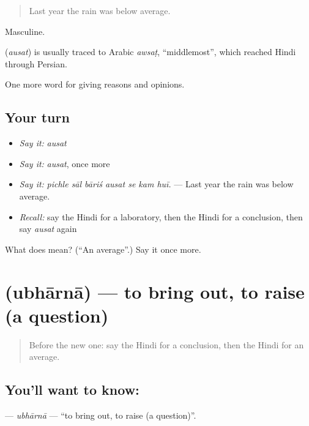 \begin{quote}
Last year the rain was below average.
\end{quote}

Masculine.

\begin{cousinweb}
\textbf{} (\emph{ausat}) is usually traced to Arabic \emph{awsaṭ}, \textquotedblleft{}middlemost\textquotedblright{}, which reached Hindi through Persian.
\end{cousinweb}

\begin{grammarlens}[title={What you've built}]
One more word for giving reasons and opinions.
\end{grammarlens}

\subsection*{Your turn}
\begin{itemize}
\raggedright
  \item \emph{Say it:} \emph{ausat}
  \item \emph{Say it:} \emph{ausat}, once more
  \item \emph{Say it:} \emph{pichle sāl bāriś ausat se kam huī.} — Last year the rain was below average.
  \item \emph{Recall:} say the Hindi for a laboratory, then the Hindi for a conclusion, then say \emph{ausat} again
\end{itemize}

\begin{tcolorbox}[breakable,colback=teal!4,colframe=teal!35!black,title={Before you move on}]
What does  mean? (\textquotedblleft{}An average\textquotedblright{}.) Say it once more.
\end{tcolorbox}
\section[\texorpdfstring{\hi{उभारना} (ubhārnā)}{उभारना (ubhārnā)}]{ (ubhārnā) — to bring out, to raise (a question)}

\label{lesson:HI-C362-ubhaarna}



\begin{quote}
Before the new one: say the Hindi for a conclusion, then the Hindi for an average.
\end{quote}

\subsection*{You'll want to know: }
\textbf{} — \emph{ubhārnā} — \textquotedblleft{}to bring out, to raise (a question)\textquotedblright{}.

